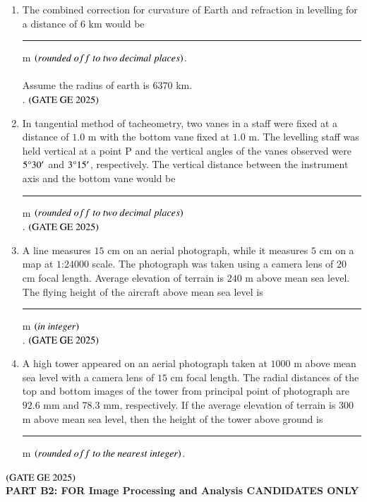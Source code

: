 \documentclass[journal,12pt,onecolumn]{IEEEtran}
\theoremstyle{remark}
\begin{document}
\begin{enumerate}
\item The combined correction for curvature of Earth and refraction in levelling for a distance of $6$ km would be \rule{2cm}{0.5mm} m $\brak{rounded\ off\ to\ two\ decimal\ places}$.\\
\\Assume the radius of earth is $6370$ km.\\.
\hfill $\left(\text{GATE GE 2025}\right)$
\bigskip
\item In tangential method of tacheometry, two vanes in a staff were fixed at a distance of $1.0$ m with the bottom vane fixed at $1.0$ m.
The levelling staff was held vertical at a point P and the vertical angles of the vanes observed were $5\degree30'$ and $3\degree15'$, respectively.
The vertical distance between the instrument axis and the bottom vane would be \rule{2cm}{0.5mm} m $\brak{rounded\ off\ to\ two\ decimal\ places}$\\.
\hfill $\left(\text{GATE GE 2025}\right)$
\bigskip
\item A line measures $15$ cm on an aerial photograph, while it measures $5$ cm on a map at $1$:$24000$ scale.
The photograph was taken using a camera lens of $20$ cm focal length.
Average elevation of terrain is $240$ m above mean sea level.
The flying height of the aircraft above mean sea level is \rule{2cm}{0.5mm} m $\left(in\ integer\right)$\\.
\hfill $\left(\text{GATE GE 2025}\right)$
\bigskip
\item A high tower appeared on an aerial photograph taken at $1000$ m above mean sea level with a camera lens of $15$ cm focal length.
The radial distances of the top and bottom images of the tower from principal point of photograph are $92.6$ mm and $78.3$ mm, respectively.
If the average elevation of terrain is $300$ m above mean sea level, then the height of the tower above ground is \rule{2cm}{0.5mm} m $\brak{rounded\ off\ to\ the\ nearest\ integer}$.
\end{enumerate}
\hfill $\left(\text{GATE GE 2025}\right)$
\bigskip
\\
\textbf{PART B2: FOR Image Processing and Analysis CANDIDATES ONLY}\\
\\
\end{document}
